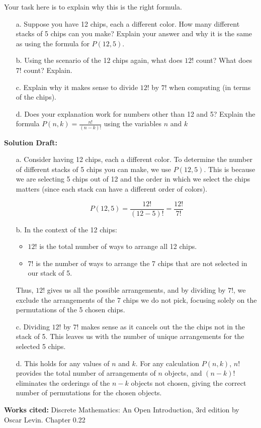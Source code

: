 \documentclass{article}
\begin{document}
Your task here is to explain why this is the right formula.
\begin{enumerate}
\item[a.]Suppose you have 12 chips, each a different color. How many different stacks of 5 chips can you make? Explain your answer and why it is the same as using the formula for $P(12,5)$.

\item[b.]Using the scenario of the 12 chips again, what does $12!$ count? What does $7!$ count? Explain.

\item[c.]Explain why it makes sense to divide $12!$ by $7!$ when computing (in terms of the chips).

\item[d.]Does your explanation work for numbers other than 12 and 5? Explain the formula $P(n,k)=\frac{n!}{(n-k)!}$
using the variables $n$ and $k$
\end{enumerate}
\noindent\textbf{Solution Draft:} 
\begin{enumerate}

\item[a.]Consider having 12 chips, each a different color. To determine the number of different stacks of 5 chips you can make, we use \( P(12, 5) \). This is because we are selecting 5 chips out of 12 and the order in which we select the chips matters (since each stack can have a different order of colors).

\[ P(12, 5) = \frac{12!}{(12-5)!} = \frac{12!}{7!} \]

\item[b.]In the context of the 12 chips:
\begin{itemize}
    \item \( 12! \) is the total number of ways to arrange all 12 chips.
    \item \( 7! \) is the number of ways to arrange the 7 chips that are not selected in our stack of 5.
\end{itemize}
Thus, \( 12! \) gives us all the possible arrangements, and by dividing by \( 7! \), we exclude the arrangements of the 7 chips we do not pick, focusing solely on the permutations of the 5 chosen chips.

\item[c.]
Dividing \( 12! \) by \( 7! \) makes sense as it cancels out the the chips not in the stack of 5. This leaves us with the number of unique arrangements for the selected 5 chips.

\item[d.]This holds for any values of \( n \) and \( k \). For any calculation \( P(n, k) \), \( n! \) provides the total number of arrangements of \( n \) objects, and \( (n-k)! \) eliminates the orderings of the \( n-k \) objects not chosen, giving the correct number of permutations for the chosen objects.

\end{enumerate}
\vspace{0.5cm}
\textbf{Works cited:}
Discrete Mathematics: An Open Introduction, 3rd edition by Oscar Levin. Chapter 0.22
\end{document}
